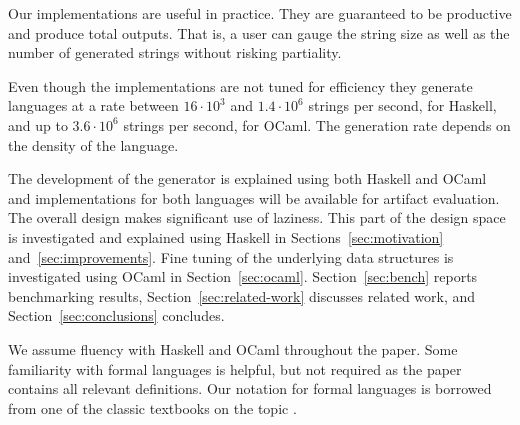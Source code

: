 Our implementations are useful in practice. They are guaranteed to be
productive and produce total outputs. That is, a user can gauge the
string size as well as the number of generated strings without risking
partiality.

Even though the implementations
are not tuned for efficiency they generate
languages at a rate between $16\cdot10^3$ and $1.4\cdot10^6$ strings per
second, for Haskell, and up to $3.6\cdot10^6$ strings per second, for
OCaml. The generation rate depends on the density of the language.


The development of the generator is explained using both Haskell and
OCaml and implementations for both languages will be available for
artifact evaluation. The overall design makes significant use of
laziness. This part of the design space is investigated and explained
using Haskell in Sections~\ref{sec:motivation}
and~\ref{sec:improvements}. Fine tuning of the underlying data
structures is investigated using OCaml in Section~\ref{sec:ocaml}.
Section~\ref{sec:bench} reports benchmarking results,
Section~\ref{sec:related-work} discusses related work, and
Section~\ref{sec:conclusions} concludes. 

We assume fluency with Haskell and OCaml throughout the paper.  Some
familiarity with formal languages is helpful, but not required as the
paper contains all relevant definitions. Our notation for formal
languages is borrowed from one of the classic textbooks on the topic
\cite{DBLP:books/daglib/0011126}.

